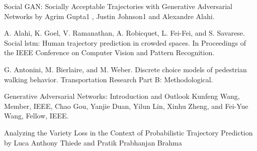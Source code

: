 \begin{thebibliography}{99}

Social GAN: Socially Acceptable Trajectories
with Generative Adversarial Networks by Agrim Gupta1 , Justin Johnson1 and Alexandre Alahi.

 A. Alahi, K. Goel, V. Ramanathan, A. Robicquet, L. Fei-Fei,
and S. Savarese. Social lstm: Human trajectory prediction in
crowded spaces. In Proceedings of the IEEE Conference on
Computer Vision and Pattern Recognition.

 G. Antonini, M. Bierlaire, and M. Weber. Discrete choice
models of pedestrian walking behavior. Transportation Research
Part B: Methodological.

 Generative Adversarial Networks: Introduction and Outlook
Kunfeng Wang, Member, IEEE, Chao Gou, Yanjie Duan, Yilun Lin, Xinhu Zheng, and Fei-Yue Wang, Fellow, IEEE.

Analyzing the Variety Loss in the Context of Probabilistic Trajectory Prediction by Luca Anthony Thiede and Pratik Prabhanjan Brahma
 
\end{thebibliography}

